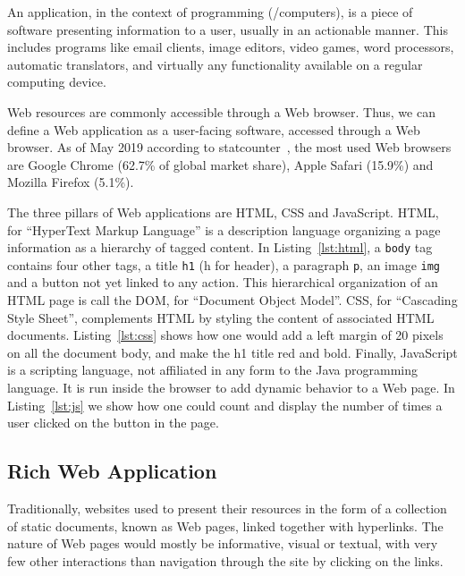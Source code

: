 An application, in the context of programming (/computers),
is a piece of software presenting information to a user,
usually in an actionable manner.
This includes programs like email clients, image editors, video games,
word processors, automatic translators, and virtually any functionality
available on a regular computing device.

Web resources are commonly accessible through a Web browser.
Thus, we can define a Web application as a user-facing software,
accessed through a Web browser.
As of May 2019 according to statcounter~\cite{browser-market-share},
the most used Web browsers are Google Chrome (62.7\% of global market share),
Apple Safari (15.9\%) and Mozilla Firefox (5.1\%).

The three pillars of Web applications are HTML, CSS and JavaScript.
HTML, for ``HyperText Markup Language'' is a description language
organizing a page information as a hierarchy of tagged content.
In Listing~\ref{lst:html}, a \verb|body| tag contains four other tags,
a title \verb|h1| (h for header), a paragraph \verb|p|, an image \verb|img|
and a button not yet linked to any action.
This hierarchical organization of an HTML page is call the DOM,
for ``Document Object Model''.
CSS, for ``Cascading Style Sheet'', complements HTML by styling
the content of associated HTML documents.
Listing~\ref{lst:css} shows how one would add a left margin of 20 pixels
on all the document body, and make the h1 title red and bold.
Finally, JavaScript is a scripting language, not affiliated in any form
to the Java programming language.
It is run inside the browser to add dynamic behavior to a Web page.
In Listing~\ref{lst:js} we show how one could count and display
the number of times a user clicked on the button in the page.





\subsection{Rich Web Application}%
\label{sub:rich_web_application}

Traditionally, websites used to present their resources in the form of a collection
of static documents, known as Web pages, linked together with hyperlinks.
The nature of Web pages would mostly be informative, visual or textual,
with very few other interactions than navigation through the site by
clicking on the links.

